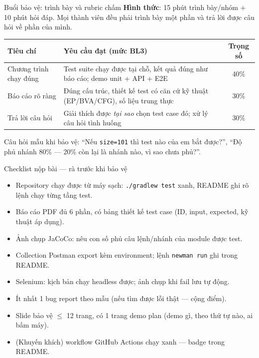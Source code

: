 \documentclass[aspectratio=169,12pt]{beamer}
\begin{document}
\begin{frame}{Buổi bảo vệ: trình bày và rubric chấm}
  \textbf{Hình thức}: 15 phút trình bày/nhóm $+$ 10 phút hỏi đáp. Mọi thành viên đều phải trình bày một phần và trả lời được câu hỏi về phần của mình.
  \small
  \begin{table}
    \small
    \begin{tabular}{@{}lp{}c@{}}
      \toprule
      \textbf{Tiêu chí} & \textbf{Yêu cầu đạt (mức BL3)} & \textbf{Trọng số} \\
      \midrule
      Chương trình chạy đúng & Test suite chạy được tại chỗ, kết quả đúng như báo cáo; demo unit + API + E2E & 40\% \\
      Báo cáo rõ ràng & Đúng cấu trúc, thiết kế test có căn cứ kỹ thuật (EP/BVA/CFG), số liệu trung thực & 30\% \\
      Trả lời câu hỏi & Giải thích được \emph{tại sao} chọn test case đó; xử lý câu hỏi tình huống & 30\% \\
      \bottomrule
    \end{tabular}
  \end{table}
  \small Câu hỏi mẫu khi bảo vệ: ``Nếu \texttt{size=101} thì test nào của em bắt được?'', ``Độ phủ nhánh 80\% --- 20\% còn lại là nhánh nào, vì sao chưa phủ?''.
\end{frame}

\begin{frame}{Checklist nộp bài --- rà trước khi bảo vệ}
  \vspace*{-0.5em}
  \begin{itemize}
    \item[$\square$] Repository chạy được từ máy sạch: \texttt{./gradlew test} xanh, README ghi rõ lệnh chạy từng tầng test.
    \item[$\square$] Báo cáo PDF đủ 6 phần, có bảng thiết kế test case (ID, input, expected, kỹ thuật áp dụng).
    \item[$\square$] Ảnh chụp JaCoCo: nêu con số phủ câu lệnh/nhánh của module được test.
    \item[$\square$] Collection Postman export kèm environment; lệnh \texttt{newman run} ghi trong README.
    \item[$\square$] Selenium: kịch bản chạy headless được; ảnh chụp khi fail lưu tự động.
    \item[$\square$] Ít nhất 1 bug report theo mẫu (nếu tìm được lỗi thật --- cộng điểm).
    \item[$\square$] Slide bảo vệ $\leq$ 12 trang, có 1 trang demo plan (demo gì, theo thứ tự nào, ai bấm máy).
    \item[$\square$] (Khuyến khích) workflow GitHub Actions chạy xanh --- badge trong README.
  \end{itemize}
\end{frame}
\end{document}
